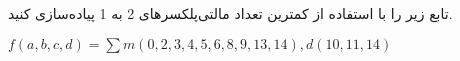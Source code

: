 تابع زیر را با استفاده از کمترین تعداد مالتی‌پلکسرهای 2 به 1 پیاده‌سازی کنید.

\begin{latin}
	$f(a,b,c,d)=\sum m(0, 2, 3, 4, 5, 6, 8, 9, 13, 14) , d(10, 11, 14)$
\end{latin}
